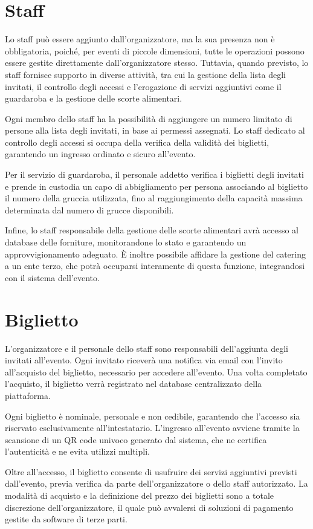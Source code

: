 \documentclass[a4paper]{article}
\begin{document}
\section{Staff}
\textcolor{textcolor}{
Lo staff può essere aggiunto dall’organizzatore, ma la sua presenza non è obbligatoria, poiché, per eventi di piccole dimensioni, tutte le operazioni possono essere gestite direttamente dall’organizzatore stesso. Tuttavia, quando previsto, lo staff fornisce supporto in diverse attività, tra cui la gestione della lista degli invitati, il controllo degli accessi e l’erogazione di servizi aggiuntivi come il guardaroba e la gestione delle scorte alimentari.

Ogni membro dello staff ha la possibilità di aggiungere un numero limitato di persone alla lista degli invitati, in base ai permessi assegnati. Lo staff dedicato al controllo degli accessi si occupa della verifica della validità dei biglietti, garantendo un ingresso ordinato e sicuro all’evento.

Per il servizio di guardaroba, il personale addetto verifica i biglietti degli invitati e prende in custodia un capo di abbigliamento per persona associando al biglietto il numero della gruccia utilizzata, fino al raggiungimento della capacità massima determinata dal numero di grucce disponibili.

Infine, lo staff responsabile della gestione delle scorte alimentari avrà accesso al database delle forniture, monitorandone lo stato e garantendo un approvvigionamento adeguato. È inoltre possibile affidare la gestione del catering a un ente terzo, che potrà occuparsi interamente di questa funzione, integrandosi con il sistema dell’evento.
}

\section{Biglietto}
\textcolor{textcolor}{
L’organizzatore e il personale dello staff sono responsabili dell’aggiunta degli invitati all’evento. Ogni invitato riceverà una notifica via email con l’invito all’acquisto del biglietto, necessario per accedere all’evento. Una volta completato l’acquisto, il biglietto verrà registrato nel database centralizzato della piattaforma.

Ogni biglietto è nominale, personale e non cedibile, garantendo che l’accesso sia riservato esclusivamente all’intestatario. L’ingresso all’evento avviene tramite la scansione di un QR code univoco generato dal sistema, che ne certifica l’autenticità e ne evita utilizzi multipli.

Oltre all’accesso, il biglietto consente di usufruire dei servizi aggiuntivi previsti dall’evento, previa verifica da parte dell’organizzatore o dello staff autorizzato. La modalità di acquisto e la definizione del prezzo dei biglietti sono a totale discrezione dell’organizzatore, il quale può avvalersi di soluzioni di pagamento gestite da software di terze parti.
}
\end{document}
